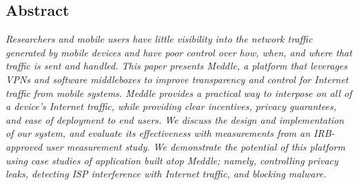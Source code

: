 \subsection*{Abstract}
{\it Researchers and mobile users have little visibility into the network 
traffic generated by  mobile devices and have poor control over 
how, when, and where that traffic is sent and handled. 
This paper presents Meddle, a platform that  leverages 
VPNs and software middleboxes to improve transparency and control 
for Internet traffic from mobile systems. Meddle provides a practical way to 
interpose on all of a device's Internet traffic, while providing clear incentives, privacy guarantees, 
and ease of deployment to end users. We discuss 
the design and implementation of our system, and evaluate its effectiveness with  
measurements from an IRB-approved user measurement study. We demonstrate the 
potential of this platform using case studies of application built atop Meddle; namely,
controlling privacy leaks, detecting ISP interference with 
Internet traffic, and blocking malware.
}






